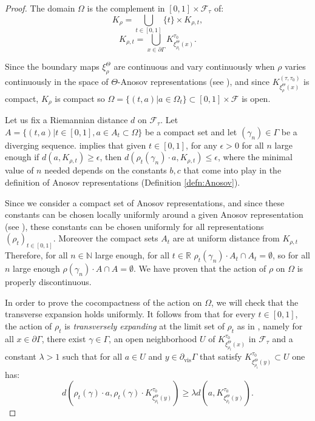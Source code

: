 \documentclass[reqno,10pt]{amsart}
\theoremstyle{plain}
\theoremstyle{definition}
\theoremstyle{remark}
\newcommand{\type}{\tau}
\newcommand{\typeS}{{\tau_0}}
\newcommand{\R}{\mathbb{R}}
\DeclareMathOperator{\vis}{vis}
\newcommand{\partialvis}{\partial_{\vis}}
\newcommand{\ie}{namely }
\begin{document}
\begin{proof}

The domain $\Omega$ is the complement in $[0,1]\times \mathcal{F}_\type$ of:
$$K_\rho=\bigcup_{t\in [0,1]} \lbrace t\rbrace \times K_{\rho,t},$$
$$K_{\rho,t}=\bigcup_{x\in \partial\Gamma}K^{\typeS}_{\xi_{\rho_t}^{\Theta}(x)}.$$



Since the boundary maps $\xi_{\rho}^{\Theta}$ are continuous and vary continuously when $\rho$ varies continuously in the space of $\Theta$-Anosov representations (see \cite[Section 6]{BPS}), and since $K^{(\type,\typeS)}_{\xi_{\rho}^{\Theta}(x)}$ is compact, $K_\rho$ is compact so $\Omega=\lbrace(t,a)|a\in \Omega_t\rbrace\subset [0,1]\times \mathcal{F}$ is open.

\medskip

 Let us fix a Riemannian distance $d$ on $\mathcal{F}_\type$. Let $A=\lbrace (t,a)|t\in[0,1], a\in A_t\subset \Omega\rbrace$ be a compact set and let $(\gamma_n)\in \Gamma$ be a diverging sequence. \cite[Corollary 6.8]{KLP-DoD} implies that given $t\in [0,1]$, for any $\epsilon>0$ for all $n$ large enough if $d(a, K_{\rho,t})\geq \epsilon$, then $d(\rho_t(\gamma_n)\cdot a, K_{\rho,t})\leq \epsilon$, where the minimal value of $n$ needed depends on the constants $b,c$ that come into play in the definition of Anosov representations (Definition \ref{defn:Anosov}).
 
 
  Since we consider a compact set of Anosov representations, and since these constants can be chosen locally uniformly around a given Anosov representation (see \cite[Theorem 7.18]{KLP}), these constants can be chosen uniformly for all representations $(\rho_t)_{t\in [0,1]}$. Moreover the compact sets $A_t$ are at uniform distance from $K_{\rho,t}$ Therefore, for all $n\in \mathbb{N}$ large enough, for all $t\in \R$ $\rho_t(\gamma_n)\cdot A_t\cap A_t=\emptyset$, so for all $n$ large enough $\rho(\gamma_n)\cdot A\cap A=\emptyset$. We have proven that the action of $\rho$ on $\Omega$ is properly discontinuous. 

\medskip

In order to prove the cocompactness of the action on $\Omega$, we will check that the transverse expansion holds uniformly. It follows from \cite[Proposition 7.7]{KLP-DoD} that for every $t\in [0,1]$, the action of ${\rho_t}$ is \emph{transversely expanding} at the limit set of $\rho_t$ as in \cite[Definition 5.21]{KLP-DoD}, \ie for all $x\in \partial\Gamma$, there exist $\gamma\in \Gamma$, an open neighborhood $U$ of $K^{\typeS}_{\xi_{\rho_t}^\Theta(x)}$ in $\mathcal{F}_\type$ and a constant $\lambda>1$ such that for all $a\in U$ and $y\in \partialvis \Gamma$ that satisfy $K^{\typeS}_{\xi_{\rho_t}^\Theta(y)}\subset U$ one has:
$$d\left(\rho_t(\gamma)\cdot a,\rho_t(\gamma)\cdot K^{\typeS}_{\xi_{\rho_t}^\Theta(y)} \right) \geq \lambda d\left(a,K^{\typeS}_{\xi_{\rho_t}^\Theta(y)}\right).$$


\end{proof}
\end{document}
